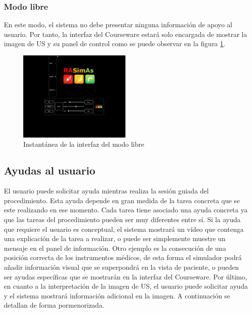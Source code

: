 \subsubsection{Modo libre}

En este modo, el sistema no debe presentar ninguna información de apoyo al usuario. Por tanto, la interfaz del \ac{Courseware} estará solo encargada de mostrar la imagen de \ac{US} y su panel de control como se puede observar en la figura \ref{fig:freeui}.

\begin{figure}[h]
    \centering
    \includegraphics[width=0.5\textwidth]{IMG/freeui.PNG}
    \caption{Instantánea de la interfaz del modo libre}
    \label{fig:freeui}
\end{figure}


 

\subsection{Ayudas al usuario}
\label{course:ayudas}
El usuario puede solicitar ayuda mientras realiza la sesión guiada del procedimiento. Esta ayuda depende en gran medida de la tarea concreta que se este realizando en ese momento. Cada tarea tiene asociado una ayuda concreta ya que las tareas del procedimiento pueden ser muy diferentes entre sí. Si la ayuda que requiere el usuario es conceptual, el sistema mostrará un vídeo que contenga una explicación de la tarea a realizar, o puede ser simplemente muestre un mensaje en el panel de información. Otro ejemplo es la consecución de una posición correcta de los instrumentos médicos, de esta forma el simulador podrá añadir información visual que se superpondrá en la vista de paciente, o pueden ser ayudas específicas que se mostrarán en la interfaz del \ac{Courseware}. Por último, en cuanto a la interpretación de la imagen de \ac{US}, el usuario puede solicitar ayuda y el sistema mostrará información adicional en la imagen. A continuación se detallan de forma pormenorizada.


